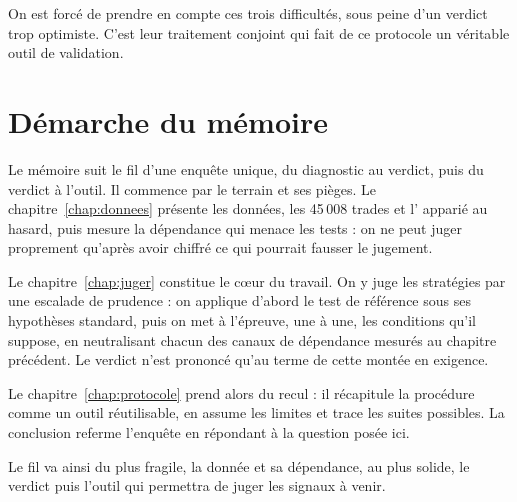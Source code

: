 On est forcé de prendre en compte ces trois difficultés, sous peine
d'un verdict trop optimiste. C'est leur traitement conjoint qui fait de ce
protocole un véritable outil de validation.

\section*{Démarche du mémoire}
\label{sec:planification}

%
%

Le mémoire suit le fil d'une enquête unique, du diagnostic au verdict, puis
du verdict à l'outil. Il commence par le terrain et ses pièges. Le
chapitre~\ref{chap:donnees} présente les données, les 45\,008 trades et
l'\edgevar{} apparié au hasard, puis mesure la dépendance qui menace les
tests : on ne peut juger proprement qu'après avoir chiffré ce qui pourrait
fausser le jugement.

Le chapitre~\ref{chap:juger} constitue le cœur du travail. On y juge les
stratégies par une escalade de prudence : on applique d'abord le test de
référence sous ses hypothèses standard, puis on met à l'épreuve, une à une,
les conditions qu'il suppose, en neutralisant chacun des canaux de dépendance
mesurés au chapitre précédent. Le verdict n'est prononcé qu'au terme de cette
montée en exigence.

Le chapitre~\ref{chap:protocole} prend alors du recul : il récapitule la
procédure comme un outil réutilisable, en assume les limites et trace les
suites possibles. La conclusion referme l'enquête en répondant à la question
posée ici.

Le fil va ainsi du plus fragile, la donnée et sa dépendance, au plus solide,
le verdict puis l'outil qui permettra de juger les signaux à venir.


